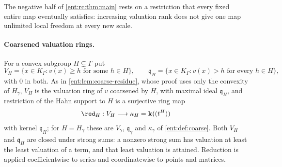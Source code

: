 \documentclass[11pt]{article}
\theoremstyle{plain}
\theoremstyle{plain}
\theoremstyle{plain}
\theoremstyle{definition}
\theoremstyle{definition}
\theoremstyle{definition}
\theoremstyle{definition}
\theoremstyle{remark}
\newcommand{\K}{K_\Gamma}\newcommand{\KD}{K_\Delta}
\newcommand{\kk}{\mathbf k}\newcommand{\PP}{\mathbb P}
\begin{document}
The negative half of \cref{ent:rc:thm:main} rests on a restriction that every
fixed entire map eventually satisfies: increasing valuation rank does not give
one map unlimited local freedom at every new scale.

\paragraph{Coarsened valuation rings.}
For a convex subgroup $H\subsetneq\Gamma$ put
\[
 V_H=\{x\in\K:v(x)\ge h\text{ for some }h\in H\},\qquad
 \mathfrak q_H=\{x\in\K:v(x)>h\text{ for every }h\in H\},
\]
with $0$ in both. As in \cref{ent:lem:coarse-residue}, whose proof uses only
the convexity of $H_\gamma$, $V_H$ is the valuation ring of $v$ coarsened by
$H$, with maximal ideal $\mathfrak q_H$, and restriction of the Hahn support
to $H$ is a surjective ring map
\[
 \red_H:V_H\longrightarrow\kappa_H=\kk((t^H))
\]
with kernel $\mathfrak q_H$; for $H=H_\gamma$ these are $V_\gamma$,
$\mathfrak q_\gamma$ and $\kappa_\gamma$ of \cref{ent:def:coarse}. Both $V_H$
and $\mathfrak q_H$ are closed under strong sums: a nonzero strong sum has
valuation at least the least valuation of a term, and that least valuation is
attained. Reduction is applied coefficientwise to series and coordinatewise to
points and matrices.
\end{document}
